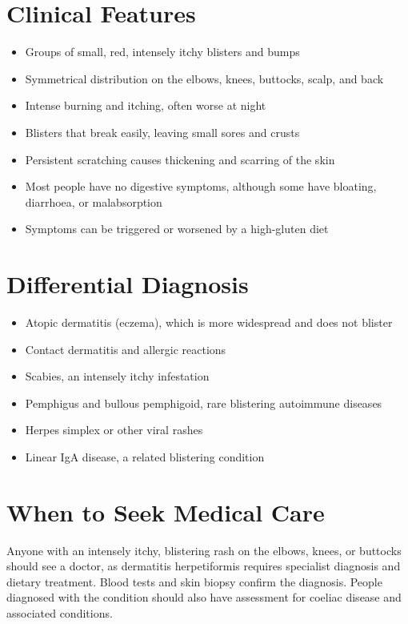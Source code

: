 \section*{Clinical Features}
\begin{itemize}
    \item Groups of small, red, intensely itchy blisters and bumps
    \item Symmetrical distribution on the elbows, knees, buttocks, scalp, and back
    \item Intense burning and itching, often worse at night
    \item Blisters that break easily, leaving small sores and crusts
    \item Persistent scratching causes thickening and scarring of the skin
    \item Most people have no digestive symptoms, although some have bloating, diarrhoea, or malabsorption
    \item Symptoms can be triggered or worsened by a high-gluten diet
\end{itemize}

\section*{Differential Diagnosis}
\begin{itemize}
    \item Atopic dermatitis (eczema), which is more widespread and does not blister
    \item Contact dermatitis and allergic reactions
    \item Scabies, an intensely itchy infestation
    \item Pemphigus and bullous pemphigoid, rare blistering autoimmune diseases
    \item Herpes simplex or other viral rashes
    \item Linear IgA disease, a related blistering condition
\end{itemize}

\section*{When to Seek Medical Care}
Anyone with an intensely itchy, blistering rash on the elbows, knees, or buttocks should see a doctor, as dermatitis herpetiformis requires specialist diagnosis and dietary treatment. Blood tests and skin biopsy confirm the diagnosis. People diagnosed with the condition should also have assessment for coeliac disease and associated conditions.

